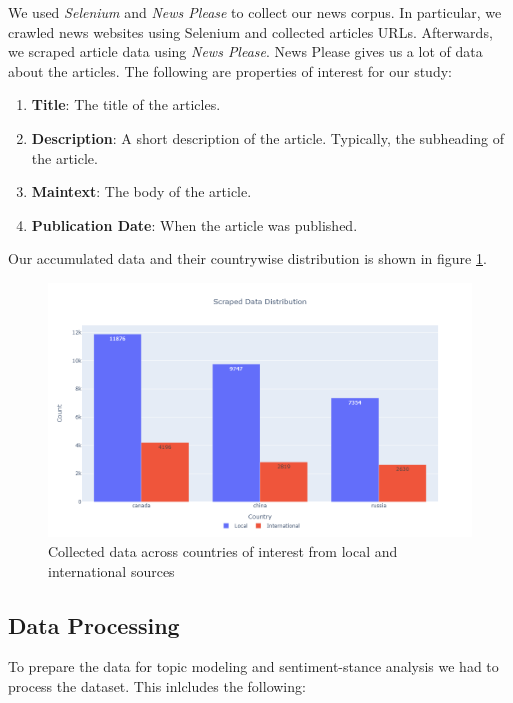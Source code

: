 \documentclass{article}
\theoremstyle{mytheoremstyle}
\theoremstyle{mytheoremstyle}
\theoremstyle{myproblemstyle}
\begin{document}
    We used \emph{Selenium} and \emph{News Please} to collect our news corpus. In particular, we crawled news websites using Selenium and collected articles URLs. Afterwards, we scraped article data using \emph{News Please}. News Please gives us a lot of data about the articles. \cite{Hamborg2017} The following are properties of interest for our study:

    \begin{enumerate}
        \item \textbf{Title}: The title of the articles.
        \item \textbf{Description}: A short description of the article. Typically, the subheading of the article.
        \item \textbf{Maintext}: The body of the article.
        \item \textbf{Publication Date}: When the article was published.
    \end{enumerate}

    Our accumulated data and their countrywise distribution is shown in figure \ref{fig:raw_data}.
    
    \begin{figure}[ht]
        \centering
        \includegraphics[width=0.75\linewidth]{barchart_scraped_data.png}
        \caption{Collected data across countries of interest from local and international sources}
        \label{fig:raw_data}
    \end{figure}

    \subsection{Data Processing}

    To prepare the data for topic modeling and sentiment-stance analysis we had to process the dataset. This inlcludes the following:
\end{document}
